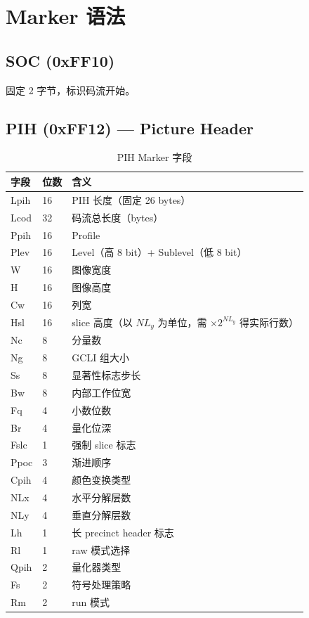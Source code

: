 \section{Marker 语法}

\subsection{SOC (0xFF10)}

固定 2 字节，标识码流开始。

\subsection{PIH (0xFF12) --- Picture Header}

\begin{table}[H]
\centering
\caption{PIH Marker 字段}
\label{tab:pih-fields}
\begin{tabular}{@{}lll@{}}
\toprule
字段 & 位数 & 含义 \\
\midrule
Lpih & 16 & PIH 长度（固定 26 bytes） \\
Lcod & 32 & 码流总长度（bytes） \\
Ppih & 16 & Profile \\
Plev & 16 & Level（高 8 bit）+ Sublevel（低 8 bit） \\
W & 16 & 图像宽度 \\
H & 16 & 图像高度 \\
Cw & 16 & 列宽 \\
Hsl & 16 & slice 高度（以 $NL_y$ 为单位，需 $\times 2^{NL_y}$ 得实际行数） \\
Nc & 8 & 分量数 \\
Ng & 8 & GCLI 组大小 \\
Ss & 8 & 显著性标志步长 \\
Bw & 8 & 内部工作位宽 \\
Fq & 4 & 小数位数 \\
Br & 4 & 量化位深 \\
Fslc & 1 & 强制 slice 标志 \\
Ppoc & 3 & 渐进顺序 \\
Cpih & 4 & 颜色变换类型 \\
NLx & 4 & 水平分解层数 \\
NLy & 4 & 垂直分解层数 \\
Lh & 1 & 长 precinct header 标志 \\
Rl & 1 & raw 模式选择 \\
Qpih & 2 & 量化器类型 \\
Fs & 2 & 符号处理策略 \\
Rm & 2 & run 模式 \\
\bottomrule
\end{tabular}
\end{table}

